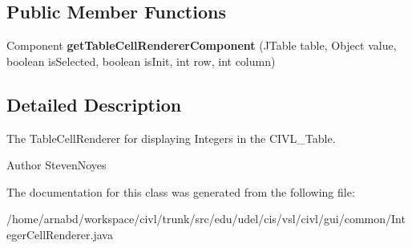\subsection*{Public Member Functions}
\begin{DoxyCompactItemize}
\item 
\hypertarget{classedu_1_1udel_1_1cis_1_1vsl_1_1civl_1_1gui_1_1common_1_1IntegerCellRenderer_a57f8f60657eb6b630983f3ae050dd985}{}Component {\bfseries get\+Table\+Cell\+Renderer\+Component} (J\+Table table, Object value, boolean is\+Selected, boolean is\+Init, int row, int column)\label{classedu_1_1udel_1_1cis_1_1vsl_1_1civl_1_1gui_1_1common_1_1IntegerCellRenderer_a57f8f60657eb6b630983f3ae050dd985}

\end{DoxyCompactItemize}


\subsection{Detailed Description}
The Table\+Cell\+Renderer for displaying Integers in the C\+I\+V\+L\+\_\+\+Table. 

\begin{DoxyAuthor}{Author}
Steven\+Noyes 
\end{DoxyAuthor}


The documentation for this class was generated from the following file\+:\begin{DoxyCompactItemize}
\item 
/home/arnabd/workspace/civl/trunk/src/edu/udel/cis/vsl/civl/gui/common/Integer\+Cell\+Renderer.\+java\end{DoxyCompactItemize}

